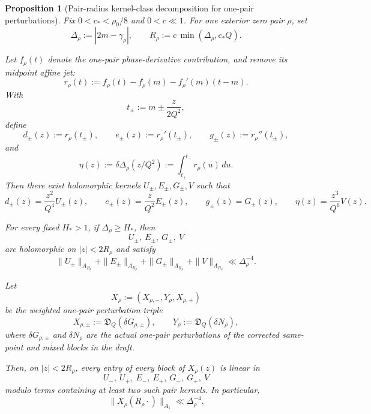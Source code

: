 \documentclass[11pt,a4paper]{amsart}
\theoremstyle{plain}
\newtheorem{proposition}[theorem]{Proposition}
\theoremstyle{definition}
\begin{document}
\begin{proposition}[Pair-radius kernel-class decomposition for one-pair perturbations]
\label{prop:one-pair-symbolic-coefficient-decomposition}
Fix $0<c_*<\rho_0/8$ and $0<c\ll 1$. For one exterior zero pair $\rho$,
set
\[
\Delta_\rho:=|2m-\gamma_\rho|,
\qquad
R_\rho:=c\,\min(\Delta_\rho,c_*Q).
\]

Let $f_\rho(t)$ denote the one-pair phase-derivative contribution, and remove
its midpoint affine jet:
\[
r_\rho(t):=f_\rho(t)-f_\rho(m)-f_\rho'(m)(t-m).
\]
With
\[
t_\pm:=m\pm \frac{z}{2Q^2},
\]
define
\[
d_\pm(z):=r_\rho(t_\pm),
\qquad
e_\pm(z):=r_\rho'(t_\pm),
\qquad
g_\pm(z):=r_\rho''(t_\pm),
\]
and
\[
\eta(z):=\delta\Delta_\rho(z/Q^2):=\int_{t_+}^{t_-} r_\rho(u)\,du.
\]
Then there exist holomorphic kernels $U_\pm,E_\pm,G_\pm,V$ such that
\[
d_\pm(z)=\frac{z^2}{Q^4}U_\pm(z),
\qquad
e_\pm(z)=\frac{z}{Q^2}E_\pm(z),
\qquad
g_\pm(z)=G_\pm(z),
\qquad
\eta(z)=\frac{z^3}{Q^6}V(z).
\]

For every fixed $H_*>1$, if $\Delta_\rho\ge H_*$, then
\[
U_\pm,\ E_\pm,\ G_\pm,\ V
\]
are holomorphic on $|z|<2R_\rho$ and satisfy
\[
\|U_\pm\|_{A_{R_\rho}}+
\|E_\pm\|_{A_{R_\rho}}+
\|G_\pm\|_{A_{R_\rho}}+
\|V\|_{A_{R_\rho}}
\ll
\Delta_\rho^{-4}.
\]

Let
\[
X_\rho:=(X_{\rho,-},Y_\rho,X_{\rho,+})
\]
be the weighted one-pair perturbation triple
\[
X_{\rho,\pm}:=\mathfrak D_Q(\delta G_{\rho,\pm}),
\qquad
Y_\rho:=\mathfrak D_Q(\delta N_\rho),
\]
where $\delta G_{\rho,\pm}$ and $\delta N_\rho$ are the actual one-pair
perturbations of the corrected same-point and mixed blocks in the draft.

Then, on $|z|<2R_\rho$, every entry of every block of $X_\rho(z)$ is
linear in
\[
U_-,\ U_+,\ E_-,\ E_+,\ G_-,\ G_+,\ V
\]
modulo terms containing at least two such pair kernels. In particular,
\[
\|X_\rho(R_\rho\cdot)\|_{A_1}\ll \Delta_\rho^{-4}.
\]
\end{proposition}
\end{document}
